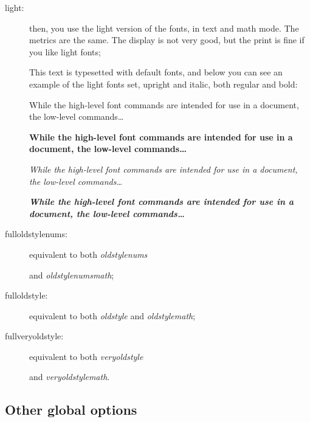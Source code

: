 \documentclass[a4paper,11pt]{article}
\begin{document}
\begin{description}
	\item[light:] then, you use the light version of the fonts, in text and math mode. The metrics are the same. 
									The display is not very good, but the print is fine if you like light fonts;
									
									This text is typesetted with default fonts, and below you can see an example of the light fonts set, upright and italic, both regular and bold:\medskip

\hfill\begin{minipage}{11cm}{\selectfont
While the high-level font commands are intended for use in a document, the low-level commands\dots
}\end{minipage}

\smallskip

\hfill\begin{minipage}{11cm}{\selectfont
\textbf{While the high-level font commands are intended for use in a document, the low-level commands\dots}
}\end{minipage}

\smallskip

\hfill\begin{minipage}{11cm}{\selectfont

\textit{While the high-level font commands are intended for use in a document, the low-level commands\dots}
}\end{minipage}

\smallskip


\hfill\begin{minipage}{11cm}{\selectfont
\textbf{\textit{While the high-level font commands are intended for use in a document, the low-level commands\dots}}
}\end{minipage}
	\item[fulloldstylenums:] equivalent to both \textit{oldstylenums}
	
			  and \textit{oldstylenumsmath};
	\item[fulloldstyle:] equivalent to both \textit{oldstyle} and \textit{oldstylemath};
	\item[fullveryoldstyle:] equivalent to both \textit{veryoldstyle} 
				
				and \textit{veryoldstylemath}.
\end{description}

\subsection{Other global options}
\end{document}
